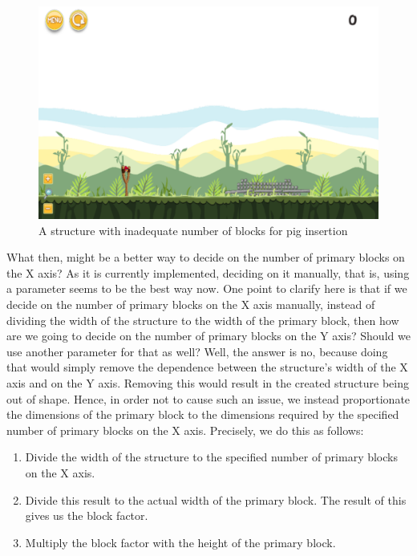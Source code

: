 \documentclass{dalthesis}
\begin{document}
\begin{enumerate}
  \begin{figure}[h]
    \centering
    \caption{A structure with inadequate number of blocks for pig insertion}
    \includegraphics[width=\textwidth,height=\textheight,keepaspectratio]{process/inadequete_number_of_blocks.png}
  \end{figure}

  What then, might be a better way to decide on the number of primary blocks on the X axis? As it is currently implemented, deciding on it manually, that is, using a parameter seems to be the best way now. One point to clarify here is that if we decide on the number of primary blocks on the X axis manually, instead of dividing the width of the structure to the width of the primary block, then how are we going to decide on the number of primary blocks on the Y axis? Should we use another parameter for that as well? Well, the answer is no, because doing that would simply remove the dependence between the structure's width of the X axis and on the Y axis. Removing this would result in the created structure being out of shape. Hence, in order not to cause such an issue, we instead proportionate the dimensions of the primary block to the dimensions required by the specified number of primary blocks on the X axis. Precisely, we do this as follows:

  \begin{enumerate}
    \item Divide the width of the structure to the specified number of primary blocks on the X axis.

    \item Divide this result to the actual width of the primary block. The result of this gives us the block factor.

    \item Multiply the block factor with the height of the primary block.


\end{enumerate}
\end{enumerate}
\end{document}
